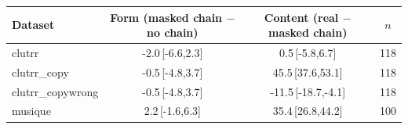 \begin{tabular}{lccc}
\toprule
Dataset & Form (masked chain $-$ no chain) & Content (real $-$ masked chain) & $n$ \\
\midrule
clutrr & -2.0\,{\scriptsize[-6.6,2.3]} & 0.5\,{\scriptsize[-5.8,6.7]} & 118 \\
clutrr\_copy & -0.5\,{\scriptsize[-4.8,3.7]} & 45.5\,{\scriptsize[37.6,53.1]} & 118 \\
clutrr\_copywrong & -0.5\,{\scriptsize[-4.8,3.7]} & -11.5\,{\scriptsize[-18.7,-4.1]} & 118 \\
musique & 2.2\,{\scriptsize[-1.6,6.3]} & 35.4\,{\scriptsize[26.8,44.2]} & 100 \\
\bottomrule
\end{tabular}
